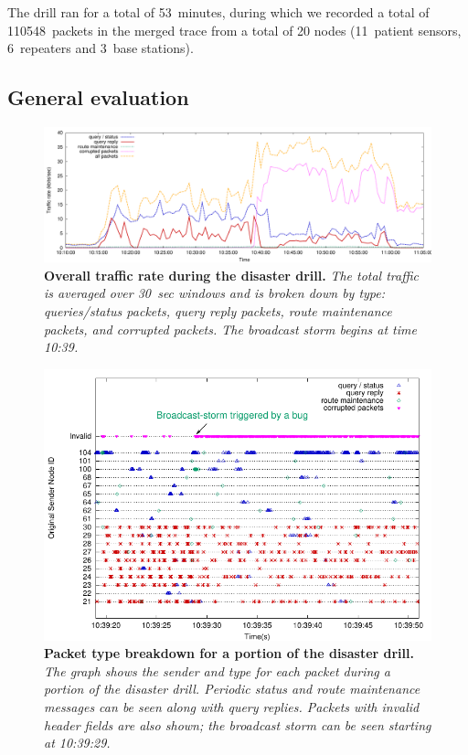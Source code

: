The drill ran for a total of 53~minutes, during which we recorded a 
total of 110548~packets in the merged trace from a total of
20 nodes (11~patient sensors, 6~repeaters and 3~base stations).



\subsection{General evaluation}
\label{sec-livenet-general-eval}

\begin{figure}[t]
\begin{center}
\includegraphics[width=0.9\hsize]{./resources/livenet-sensys07/figs/drill/rate/drill-rate.pdf}
\end{center}
\caption{\small {\bf Overall traffic rate during the disaster drill.}
{\em The total traffic is averaged over 30~sec windows and
is broken down by type: queries/status packets, query reply
packets, route maintenance packets, and corrupted packets. The broadcast storm
begins at time 10:39.}}
\label{fig-drill-traffic}
\end{figure}

\begin{figure}[t]
\begin{center}
\includegraphics[width=0.6\hsize]{./resources/livenet-sensys07/figs/drill/type/type.pdf}
\end{center}
\caption{\small {\bf Packet type breakdown for a portion of the
disaster drill.} 
{\em The graph shows the sender and type for each packet during a
portion of the disaster drill. Periodic status and route maintenance
messages can be seen along with query replies. Packets with invalid header
fields are also shown; the broadcast storm can be seen starting at 10:39:29.}}
\label{fig-drill-type}
\end{figure}


